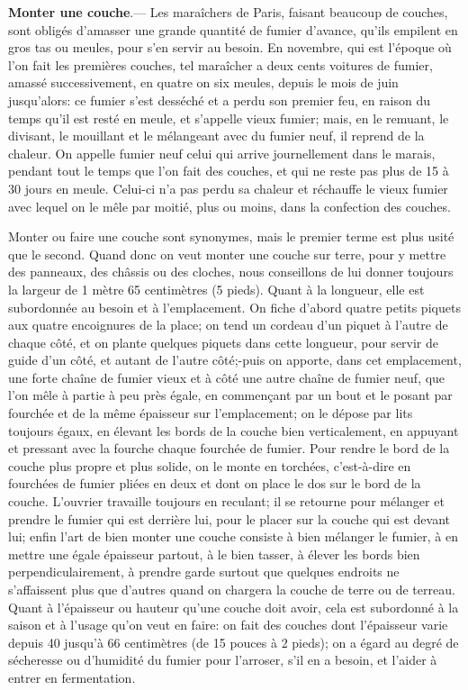 \documentclass[10pt,a4paper]{book}
\begin{document}
\textbf{Monter une couche}.--- Les maraîchers de Paris, faisant beaucoup de couches, sont obligés d'amasser une grande quantité de fumier d'avance, qu'ils empilent en gros tas ou meules, pour s'en servir au besoin. En novembre, qui est l'époque où l'on fait les premières couches, tel maraîcher a deux cents voitures de fumier, amassé successivement, en quatre on six meules, depuis le mois de juin jusqu'alors: ce fumier s'est desséché et a perdu son premier feu, en raison du temps qu'il est resté en meule, et s'appelle vieux fumier; mais, en le remuant, le divisant, le mouillant et le mélangeant avec du fumier neuf, il reprend de la chaleur. On appelle fumier neuf celui qui arrive journellement dans le marais, pendant tout le temps que l'on fait des couches, et qui ne reste pas plus de 15 à 30 jours en meule. Celui-ci n'a pas perdu sa chaleur et réchauffe le vieux fumier avec lequel on le mêle par moitié, plus ou moins, dans la confection des couches.

Monter ou faire une couche sont synonymes, mais le premier terme est plus usité que le second. Quand donc on veut monter une couche sur terre, pour y mettre des panneaux, des châssis ou des cloches, nous conseillons de lui donner toujours la largeur de 1 mètre 65 centimètres (5 pieds). Quant à la longueur, elle est subordonnée au besoin et à l'emplacement. On fiche d'abord quatre petits piquets aux quatre encoignures de la place; on tend un cordeau d'un piquet à l'autre de chaque côté, et on plante quelques piquets dans cette longueur, pour servir de guide d'un côté, et autant de l'autre côté;-puis on apporte, dans cet emplacement, une forte chaîne de fumier vieux et à côté une autre chaîne de fumier neuf, que l'on mêle à partie à peu près égale, en commençant par un bout et le posant par fourchée et de la même épaisseur sur l'emplacement; on le dépose par lits toujours égaux, en élevant les bords de la couche bien verticalement, en appuyant et pressant avec la fourche chaque fourchée de fumier. Pour rendre le bord de la couche plus propre et plus solide, on le monte en torchées, c'est-à-dire en fourchées de fumier pliées en deux et dont on place le dos sur le bord de la couche. L'ouvrier travaille toujours en reculant; il se retourne pour mélanger et prendre le fumier qui est derrière lui, pour le placer sur la couche qui est devant lui; enfin l'art de bien monter une couche consiste à bien mélanger le fumier, à en mettre une égale épaisseur partout, à le bien tasser, à élever les bords bien perpendiculairement, à prendre garde surtout que quelques endroits ne s'affaissent plus que d'autres quand on chargera la couche de terre ou de terreau. Quant à l'épaisseur ou hauteur qu'une couche doit avoir, cela est subordonné à la saison et à l'usage qu'on veut en faire: on fait des couches dont l'épaisseur varie depuis 40 jusqu'à 66 centimètres (de 15 pouces à 2 pieds); on a égard au degré de sécheresse ou d'humidité du fumier pour l'arroser, s'il en a besoin, et l'aider à entrer en fermentation.
\end{document}
